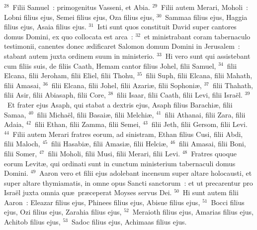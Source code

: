 ${}^{28}$~Filii Samuel~: primogenitus Vasseni, et Abia.
${}^{29}$~Filii autem Merari, Moholi~: Lobni filius ejus, Semei filius ejus, Oza filius ejus,
${}^{30}$~Sammaa filius ejus, Haggia filius ejus, Asaia filius ejus.
${}^{31}$~Isti sunt quos constituit David super cantores domus Domini, ex quo collocata est arca~:
${}^{32}$~et ministrabant coram tabernaculo testimonii, canentes donec \ae dificaret Salomon domum Domini in Jerusalem~: stabant autem juxta ordinem suum in ministerio.
${}^{33}$~Hi vero sunt qui assistebant cum filiis suis, de filiis Caath, Hemam cantor filius Johel, filii Samuel,
${}^{34}$~filii Elcana, filii Jeroham, filii Eliel, filii Thohu,
${}^{35}$~filii Suph, filii Elcana, filii Mahath, filii Amasai,
${}^{36}$~filii Elcana, filii Johel, filii Azari\ae , filii Sophoni\ae ,
${}^{37}$~filii Thahath, filii Asir, filii Abiasaph, filii Core,
${}^{38}$~filii Isaar, filii Caath, filii Levi, filii Isra\"el.
${}^{39}$~Et frater ejus Asaph, qui stabat a dextris ejus, Asaph filius Barachi\ae , filii Samaa,
${}^{40}$~filii Micha\"el, filii Basai\ae , filii Melchi\ae ,
${}^{41}$~filii Athanai, filii Zara, filii Adaia,
${}^{42}$~filii Ethan, filii Zamma, filii Semei,
${}^{43}$~filii Jeth, filii Gersom, filii Levi.
${}^{44}$~Filii autem Merari fratres eorum, ad sinistram, Ethan filius Cusi, filii Abdi, filii Maloch,
${}^{45}$~filii Hasabi\ae , filii Amasi\ae , filii Helci\ae ,
${}^{46}$~filii Amasai, filii Boni, filii Somer,
${}^{47}$~filii Moholi, filii Musi, filii Merari, filii Levi.
${}^{48}$~Fratres quoque eorum Levit\ae , qui ordinati sunt in cunctum ministerium tabernaculi domus Domini.
${}^{49}$~Aaron vero et filii ejus adolebant incensum super altare holocausti, et super altare thymiamatis, in omne opus Sancti sanctorum~: et ut precarentur pro Isra\"el juxta omnia qu\ae\ pr\ae ceperat Moyses servus Dei.
${}^{50}$~Hi sunt autem filii Aaron~: Eleazar filius ejus, Phinees filius ejus, Abisue filius ejus,
${}^{51}$~Bocci filius ejus, Ozi filius ejus, Zarahia filius ejus,
${}^{52}$~Meraioth filius ejus, Amarias filius ejus, Achitob filius ejus,
${}^{53}$~Sadoc filius ejus, Achimaas filius ejus.


